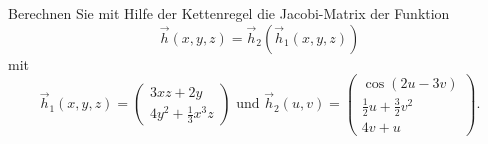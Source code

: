 {
Berechnen Sie mit Hilfe der Kettenregel die Jacobi-Matrix der Funktion 
$$\vec h(x,y,z)=\vec h_2(\vec h_1(x,y,z))$$
 mit 
$$\vec h_1(x,y,z)=\begin{pmatrix} 3xz+2y\\4y^2+\frac{1}{3}x^3z\end{pmatrix}\text{ und } 
\vec h_2(u,v)=\begin{pmatrix}
\cos(2u-3v)\\\frac{1}{2}u+\frac{3}{2}v^2\\4v+u\end{pmatrix}. $$
}
